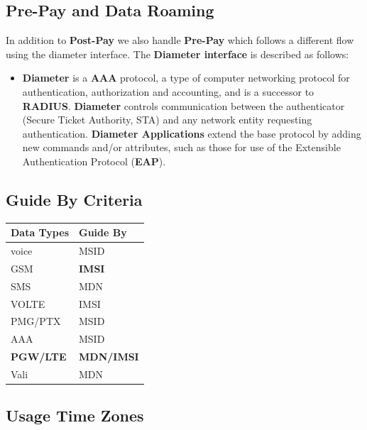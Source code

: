 \documentclass[12pt,twoside]{article}
\begin{document}
\subsection{Pre-Pay and Data Roaming}
\label{sec-2-2}

   In addition to \textbf{Post-Pay} we also handle \textbf{Pre-Pay} which follows a different flow using the diameter interface. The \textbf{Diameter interface} is described as follows:
\begin{itemize}
\item \textbf{Diameter} is a \textbf{AAA} protocol, a type of computer networking
     protocol for authentication, authorization and accounting, and is
     a successor to \textbf{RADIUS}. \textbf{Diameter} controls communication
     between the authenticator (Secure Ticket Authority, STA) and any
     network entity requesting authentication. \textbf{Diameter Applications}
     extend the base protocol by adding new commands and/or
     attributes, such as those for use of the Extensible
     Authentication Protocol (\textbf{EAP}).
\end{itemize}
\subsection{Guide By Criteria}
\label{sec-2-3}


\begin{center}
\begin{tabular}{ll}
\hline
 \textbf{Data Types}  &  \textbf{Guide By}  \\
\hline
 voice                &  MSID               \\
 GSM                  &  \textbf{IMSI}      \\
 SMS                  &  MDN                \\
 VOLTE                &  IMSI               \\
 PMG/PTX              &  MSID               \\
 AAA                  &  MSID               \\
 \textbf{PGW/LTE}     &  \textbf{MDN/IMSI}  \\
 Vali                 &  MDN                \\
\hline
\end{tabular}
\end{center}
\subsection{Usage Time Zones}
\label{sec-2-4}
\end{document}
